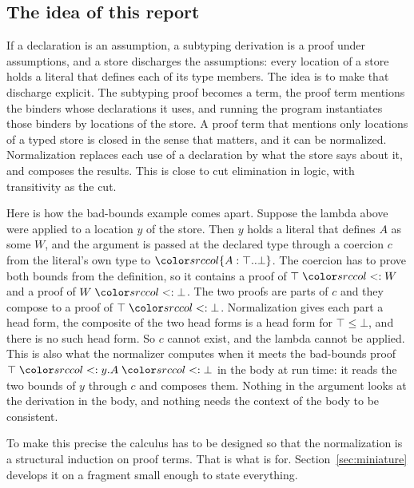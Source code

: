 \subsection{The idea of this report}\label{sec:idea}

If a declaration is an assumption, a subtyping derivation is a proof under assumptions, and a store discharges the assumptions: every location of a store holds a literal that defines each of its type members. The idea is to make that discharge explicit. The subtyping proof becomes a term, the proof term mentions the binders whose declarations it uses, and running the program instantiates those binders by locations of the store. A proof term that mentions only locations of a typed store is closed in the sense that matters, and it can be normalized. Normalization replaces each use of a declaration by what the store says about it, and composes the results. This is close to cut elimination in logic, with transitivity as the cut.

Here is how the bad-bounds example comes apart. Suppose the lambda above were applied to a location $y$ of the store. Then $y$ holds a literal that defines $A$ as some $W$, and the argument is passed at the declared type through a coercion $c$ from the literal's own type to $\dtyp{A}{\top}{\bot}$. The coercion has to prove both bounds from the definition, so it contains a proof of $\top \sub W$ and a proof of $W \sub \bot$. The two proofs are parts of $c$ and they compose to a proof of $\top \sub \bot$. Normalization gives each part a head form, the composite of the two head forms is a head form for $\top \le \bot$, and there is no such head form. So $c$ cannot exist, and the lambda cannot be applied. This is also what the normalizer computes when it meets the bad-bounds proof $\top \sub y.A \sub \bot$ in the body at run time: it reads the two bounds of $y$ through $c$ and composes them. Nothing in the argument looks at the derivation in the body, and nothing needs the context of the body to be consistent.

To make this precise the calculus has to be designed so that the normalization is a structural induction on proof terms. That is what \FCdot is for. Section~\ref{sec:miniature} develops it on a fragment small enough to state everything.

